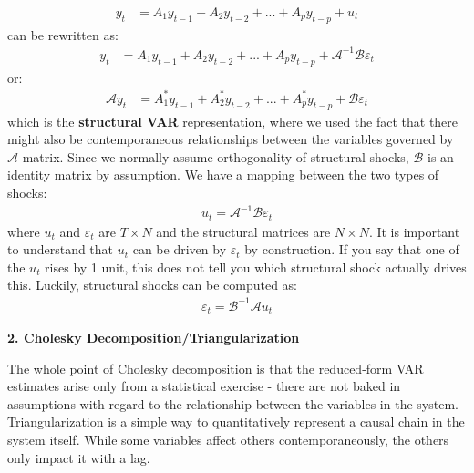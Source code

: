 \documentclass[a4paper, 12pt]{article}
\begin{document}
\begin{equation}
\begin{aligned}
y_{t} &=A_1 y_{t-1}+A_2 y_{t-2}+...+A_p y_{t-p}+u_t \nonumber
\end{aligned}
\end{equation}
can be rewritten as: 
\begin{equation}
\begin{aligned}
y_{t} &=A_1 y_{t-1}+A_2 y_{t-2}+...+A_p y_{t-p}+\mathcal{A}^{-1}\mathcal{B}\varepsilon_t \nonumber
\end{aligned}
\end{equation}
or:
\begin{equation}
\begin{aligned}
\mathcal{A}y_{t} &=A^*_1 y_{t-1}+A^*_2 y_{t-2}+...+A^*_p y_{t-p}+\mathcal{B}\varepsilon_t \nonumber
\end{aligned}
\end{equation}
which is the \textbf{structural VAR} representation, where we used the fact that there might also be contemporaneous relationships between the variables governed by $\mathcal{A}$ matrix. Since we normally assume orthogonality of structural shocks, $\mathcal{B}$ is an identity matrix by assumption. 
We have a mapping between the two types of shocks:
\begin{equation}
\begin{aligned}
u_t=\mathcal{A}^{-1}\mathcal{B}\varepsilon_t\nonumber
\end{aligned}
\end{equation}
where $u_t$ and $\varepsilon_t$ are $T\times N$ and the structural matrices are $N\times N$. It is important to understand that $u_t$ can be driven by $\varepsilon_t$ by construction. If you say that one of the $u_t$ rises by 1 unit, this does not tell you which structural shock actually drives this. Luckily, structural shocks can be computed as:
\begin{equation}
\begin{aligned}
\varepsilon_t=\mathcal{B}^{-1}\mathcal{A}u_t\nonumber
\end{aligned}
\end{equation}
\begin{center}
\textbf{2. Cholesky Decomposition/Triangularization}
\end{center}
The whole point of Cholesky decomposition is that the reduced-form VAR estimates arise only from a statistical exercise - there are not baked in assumptions with regard to the
relationship between the variables in the system. Triangularization is a simple way to quantitatively represent a causal chain in the system itself. While some variables affect others contemporaneously, the others only impact it with a lag. 
\end{document}

